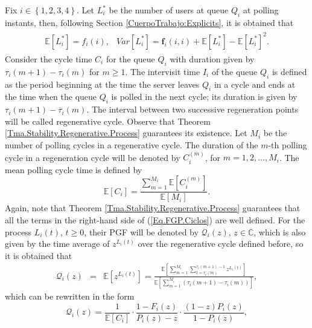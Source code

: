 \documentclass{article}
\newcommand{\esp}{\mathbb{E}}
\begin{document}
Fix $i\in\left\{1,2,3,4\right\}$. Let $L_{i}^{*}$ be the number of users at queue $Q_{i}$ at polling instants, then, following Section \ref{CuerpoTrabajo:Explicits}, it is obtained that
\begin{eqnarray}
\begin{array}{cc}
\esp\left[L_{i}^{*}\right]=f_{i}\left(i\right), &
Var\left[L_{i}^{*}\right]=\mathbf{f}_{i}\left(i,i\right)+\esp\left[L_{i}^{*}\right]-\esp\left[L_{i}^{*}\right]^{2}.
\end{array}
\end{eqnarray}
Consider the cycle time $C_{i}$ for the queue $Q_{i}$ with duration given by $\tau_{i}\left(m+1\right)-\tau_{i}\left(m\right)$ for $m\geq1$. The intervisit time $I_{i}$ of the queue $Q_{i}$ is defined as the period beginning at the time the server leaves $Q_{i}$ in a cycle and ends at the time when the queue $Q_{i}$ is polled in the next cycle; its duration is given by $\tau_{i}\left(m+1\right)-\overline{\tau}_{i}\left(m\right)$. The interval between two successive regeneration points will be called regenerative cycle. Observe that Theorem \ref{Tma.Stability.Regenerative.Process} guarantees its existence. Let $M_{i}$ be the number of polling cycles in a regenerative cycle. The duration of the $m$-th polling cycle in a regeneration cycle will be denoted by $C_{i}^{(m)}$, for $m=1,2,\ldots,M_{i}$. The mean polling cycle time is defined by
\begin{equation}\label{Eq.FGP.Ciclos}
\esp\left[C_{i}\right]=\frac{\sum_{m=1}^{M_{i}}\esp\left[C_{i}^{(m)}\right]}{\esp\left[M_{i}\right]}.
\end{equation}
Again, note that Theorem \ref{Tma.Stability.Regenerative.Process} guarantees that all the terms in the right-hand side of (\ref{Eq.FGP.Ciclos}) are well defined.
For the process $L_{i}\left(t\right)$, $t\geq0$, their PGF will be denoted by $\mathcal{Q}_{i}\left(z\right)$, $z\in\mathbb{C}$, which is also given by the time average of $z^{L_{i}\left(t\right)}$ over the regenerative cycle defined before, so it is obtained that
\begin{eqnarray}\label{Eq.Q.any.time}
\mathcal{Q}_{i}\left(z\right)&=&\esp\left[z^{L_{i}\left(t\right)}\right]=\frac{\esp\left[\sum_{m=1}^{M_{i}}\sum_{t=\tau_{i}\left(m\right)}^{\tau_{i}\left(m+1\right)-1}z^{L_{i}\left(t\right)}\right]}{\esp\left[\sum_{m=1}^{M_{i}}\left(\tau_{i}\left(m+1\right)-\tau_{i}\left(m\right)\right)\right]},
\end{eqnarray}
which can be rewritten in the form 
\begin{equation}\label{Eq.Long.Caulquier.Tiempo}
\mathcal{Q}_{i}\left(z\right)=\frac{1}{\esp\left[C_{i}\right]}\cdot\frac{1-F_{i}\left(z\right)}{P_{i}\left(z\right)-z}\cdot\frac{\left(1-z\right)P_{i}\left(z\right)}{1-P_{i}\left(z\right)},
\end{equation}%
\end{document}
